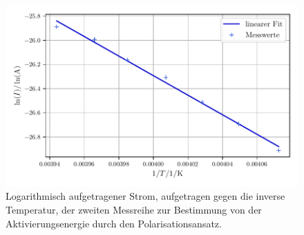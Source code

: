 \begin{figure}
    \centering
    \includegraphics[width=0.7\linewidth]{scripts/build/plot2_1.pdf}
    \caption{Logarithmisch aufgetragener Strom, aufgetragen gegen die inverse Temperatur, der zweiten Messreihe zur Bestimmung von der Aktivierungsenergie durch den Polarisationsansatz.}
    \label{fig:W1_2}
\end{figure}
\newpage
